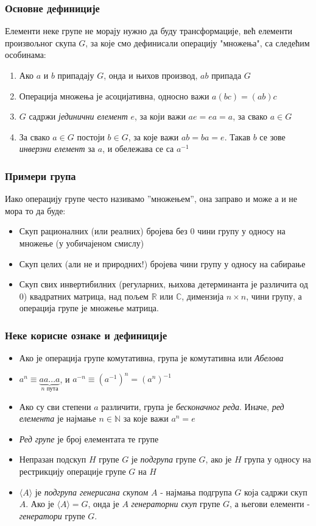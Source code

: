 \documentclass{beamer}
\theoremstyle{plain}
\theoremstyle{definition}
\begin{document}
\begin{frame}
\frametitle{Основне дефиниције}
Елементи неке групе не морају нужно да буду трансформације, већ елементи произвољног скупа $G$, за које смо дефинисали операцију "множења", са следећим особинама:
\begin{enumerate}
  \item Ако $a$ и $b$ припадају $G$, онда и њихов производ, $ab$ припада $G$
  \item Операција множења је асоцијативна, односно важи $a(bc) = (ab)c$
  \item $G$ садржи \emph{јединични елемент} $e$, за који важи $ae = ea = a$, за свако $a\in G$
  \item За свако $a\in G$ постоји $b\in G$, за које важи $ab = ba = e$. Такав $b$ се зове \emph{инверзни елемент} за $a$, и обележава се са $a^{-1}$
\end{enumerate}
\end{frame}

\begin{frame}
\frametitle{Примери група}
Иако операцију групе често називамо ''множењем'', она заправо и може а и не мора то да буде:
\begin{itemize}
  \item Скуп рационалних (или реалних) бројева без $0$ чини групу у односу на множење (у уобичајеном смислу)
  \item Скуп целих (али не и природних!) бројева чини групу у односу на сабирање
  \item Скуп свих инвертибилних (регуларних, њихова детерминанта је различита од $0$) квадратних матрица, над пољем $\mathbb{R}$ или $\mathbb{C}$, димензија $n\times n$, чини групу, а операција групе је множење матрица.
\end{itemize}
\end{frame}

\begin{frame}
\frametitle{Неке корисне ознаке и дефиниције}
\begin{itemize}
  \item Ако је операција групе комутативна, група је комутативна или \emph{Абелова}
  \item $a^n \equiv \underbrace{aa...a}_{n\text{ пута}} $, и $a^{-n} \equiv (a^{-1})^n = (a^n)^{-1}$
  \item Ако су сви степени $a$ различити, група је \emph{бесконачног реда}. Иначе, \emph{ред елемента} је најмање $n\in \mathbb{N}$ за које важи $a^n = e$
  \item \emph{Ред групе} је број елементата те групе
  \item Непразан подскуп $H$ групе $G$ је \emph{подгрупа} групе $G$, ако је $H$ група у односу на рестрикцију операције групе $G$ на $H$
  \item $\langle A\rangle$ је \emph{подгрупа генерисана скупом $A$} - најмања подгрупа $G$ која садржи скуп $A$. Ако је $\langle A\rangle=G$, онда је $A$ \emph{генераторни скуп} групе $G$, а његови елементи - \emph{генератори} групе $G$.
\end{itemize}
\end{frame}
\end{document}
